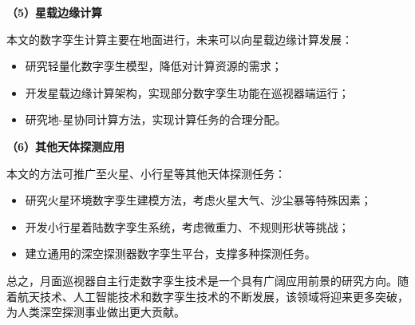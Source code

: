 \textbf{（5）星载边缘计算}

本文的数字孪生计算主要在地面进行，未来可以向星载边缘计算发展：
\begin{itemize}
    \item 研究轻量化数字孪生模型，降低对计算资源的需求；
    \item 开发星载边缘计算架构，实现部分数字孪生功能在巡视器端运行；
    \item 研究地-星协同计算方法，实现计算任务的合理分配。
\end{itemize}

\textbf{（6）其他天体探测应用}

本文的方法可推广至火星、小行星等其他天体探测任务：
\begin{itemize}
    \item 研究火星环境数字孪生建模方法，考虑火星大气、沙尘暴等特殊因素；
    \item 开发小行星着陆数字孪生系统，考虑微重力、不规则形状等挑战；
    \item 建立通用的深空探测器数字孪生平台，支撑多种探测任务。
\end{itemize}

总之，月面巡视器自主行走数字孪生技术是一个具有广阔应用前景的研究方向。随着航天技术、人工智能技术和数字孪生技术的不断发展，该领域将迎来更多突破，为人类深空探测事业做出更大贡献。
